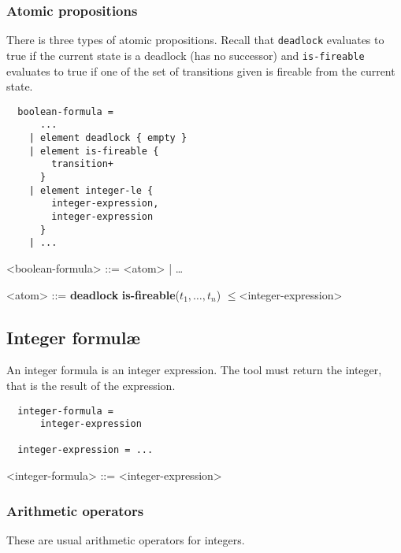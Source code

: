 \documentclass[10pt,english,a4paper]{article}
\newcommand\atomleq          {\boldmath$\leq$\xspace}
\newcommand\atomdead         {\textbf{deadlock}\xspace}
\newcommand\atomisfire[1]    {\textbf{is-fireable}(#1)}
\begin{document}
\subsubsection{Atomic propositions}

There is three types of atomic propositions.
Recall that
\lstinline!deadlock! evaluates to true if the current state is a deadlock
(has no successor) and
\lstinline!is-fireable! evaluates to true if one of the set of transitions
given is fireable from the current state.

\begin{multicols}{2}
\begin{lstlisting}
  boolean-formula =
      ...
    | element deadlock { empty }
    | element is-fireable {
        transition+
      }
    | element integer-le {
        integer-expression,
        integer-expression
      }
    | ...
\end{lstlisting}
\columnbreak
\setlength{\grammarindent}{6em}
\begin{grammar}
<boolean-formula> ::= <atom> | \ldots

<atom> ::= \atomdead
\alt \atomisfire{$t_1, \ldots, t_n$}
 \atomleq <integer-expression>
\end{grammar}
\end{multicols}


\subsection{Integer formul{\ae}}

An integer formula is an integer expression.
The tool must return the integer, that is the result of the expression.

\begin{multicols}{2}
\begin{lstlisting}
  integer-formula =
      integer-expression

  integer-expression = ...
\end{lstlisting}
\columnbreak
\begin{grammar}
<integer-formula> ::= <integer-expression>
\end{grammar}
\end{multicols}

\subsubsection{Arithmetic operators}

These are usual arithmetic operators for integers.
\end{document}
